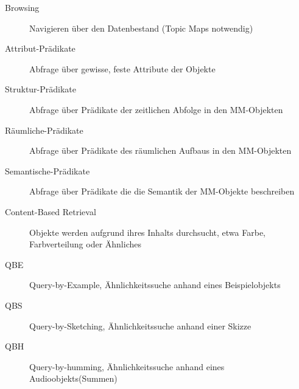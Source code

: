 \documentclass{article}
\begin{document}
\begin{description}
	\item[Browsing] Navigieren über den Datenbestand (Topic Maps notwendig)
	\item[Attribut-Prädikate] Abfrage über gewisse, feste Attribute der Objekte
	\item[Struktur-Prädikate] Abfrage über Prädikate der zeitlichen Abfolge in den MM-Objekten
	\item[Räumliche-Prädikate] Abfrage über Prädikate des räumlichen Aufbaus in den MM-Objekten
	\item[Semantische-Prädikate] Abfrage über Prädikate die die Semantik der MM-Objekte beschreiben
	\item[Content-Based Retrieval] Objekte werden aufgrund ihres Inhalts durchsucht, etwa Farbe, Farbverteilung oder Ähnliches
	\item[QBE] Query-by-Example, Ähnlichkeitssuche anhand eines Beispielobjekts
	\item[QBS] Query-by-Sketching, Ähnlichkeitssuche anhand einer Skizze
	\item[QBH] Query-by-humming, Ähnlichkeitssuche anhand eines Audioobjekts(Summen)
\end{description}
\end{document}
